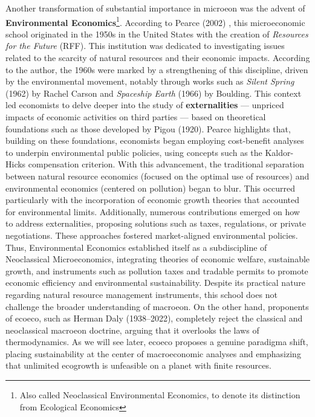 \documentclass[./main_en.tex]{subfiles}
\begin{document}
\par Another transformation of substantial importance in \gls{microeon} was the advent of \textbf{Environmental Economics}\footnote{Also called Neoclassical Environmental Economics, to denote its distinction from Ecological Economics}. According to Pearce (2002) \cite{Pearce2002a}, this microeconomic school originated in the 1950s in the United States with the creation of \textit{Resources for the Future} (RFF). This institution was dedicated to investigating issues related to the scarcity of natural resources and their economic impacts. According to the author, the 1960s were marked by a strengthening of this discipline, driven by the environmental movement, notably through works such as \textit{Silent Spring} (1962) by Rachel Carson and \textit{Spaceship Earth} (1966) by Boulding. This context led economists to delve deeper into the study of \textbf{externalities} — unpriced impacts of economic activities on third parties — based on theoretical foundations such as those developed by Pigou (1920). Pearce highlights that, building on these foundations, economists began employing cost-benefit analyses to underpin environmental public policies, using concepts such as the Kaldor-Hicks compensation criterion. With this advancement, the traditional separation between natural resource economics (focused on the optimal use of resources) and environmental economics (centered on pollution) began to blur. This occurred particularly with the incorporation of economic growth theories that accounted for environmental limits. Additionally, numerous contributions emerged on how to address externalities, proposing solutions such as taxes, regulations, or private negotiations. These approaches fostered market-aligned environmental policies. Thus, Environmental Economics established itself as a subdiscipline of Neoclassical Microeconomics, integrating theories of economic welfare, sustainable growth, and instruments such as pollution taxes and tradable permits to promote economic efficiency and environmental sustainability. Despite its practical nature regarding natural resource management instruments, this school does not challenge the broader understanding of \gls{macroeon}. On the other hand, proponents of \gls{ecoeco}, such as Herman Daly (1938–2022), completely reject the classical and neoclassical \gls{macroeon} doctrine, arguing that it overlooks the laws of thermodynamics. As we will see later, \gls{ecoeco} proposes a genuine \gls{paradigma} shift, placing sustainability at the center of macroeconomic analyses and emphasizing that unlimited \gls{ecogrowth} is unfeasible on a planet with finite resources.
\end{document}
